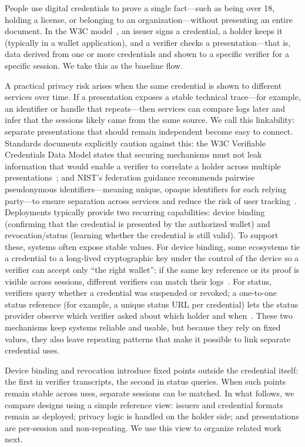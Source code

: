 People use digital credentials to prove a single fact---such as being over 18, holding a license, or belonging to an organization---without presenting an entire document.
In the W3C model~\cite{w3c-vc-data-model-2}, an issuer signs a credential, a holder keeps it (typically in a wallet application), and a verifier checks a presentation---that is, data derived from one or more credentials and shown to a specific verifier for a specific session. We take this as the baseline flow.

A practical privacy risk arises when the same credential is shown to different services over time. If a presentation exposes a stable technical trace---for example, an identifier or handle that repeats---then services can compare logs later and infer that the sessions likely came from the same source.
We call this linkability: separate presentations that should remain independent become easy to connect. Standards documents explicitly caution against this: the W3C Verifiable Credentials Data Model states that securing mechanisms must not leak information that would enable a verifier to correlate a holder across multiple presentations~\cite{w3c-vc-data-model-2}; and NIST’s federation guidance recommends pairwise pseudonymous identifiers---meaning unique, opaque identifiers for each relying party---to ensure separation across services and reduce the risk of user tracking~\cite{nist-sp800-63c}.
Deployments typically provide two recurring capabilities: device binding (confirming that the credential is presented by the authorized wallet) and revocation/status (learning whether the credential is still valid). To support these, systems often expose stable values.
For device binding, some ecosystems tie a credential to a long-lived cryptographic key under the control of the device so a verifier can accept only “the right wallet”; if the same key reference or its proof is visible across sessions, different verifiers can match their logs~\cite{IETF:FetYasCam25}.
For status, verifiers query whether a credential was suspended or revoked; a one-to-one status reference (for example, a unique status URL per credential) lets the status provider observe which verifier asked about which holder and when~\cite{w3c-vc-data-model-2}.
These two mechanisms keep systems reliable and usable, but because they rely on fixed values, they also leave repeating patterns that make it possible to link separate credential uses.

Device binding and revocation introduce fixed points outside the credential itself: the first in verifier transcripts, the second in status queries. When such points remain stable across uses, separate sessions can be matched. In what follows, we compare designs using a simple reference view: issuers and credential formats remain as deployed; privacy logic is handled on the holder side; and presentations are per-session and non-repeating. We use this view to organize related work next.

